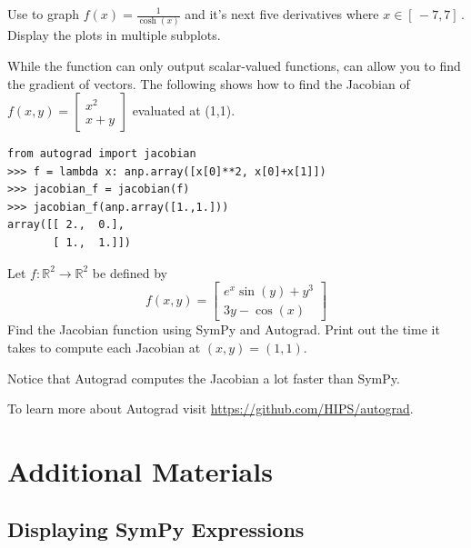 \begin{problem}
Use  to graph $f(x)=\frac{1}{\cosh\left(x\right)}$ and it's next five derivatives where $x\in[\,-7,7 ]\,$. Display the plots in multiple subplots.
\end{problem}

While the  function can only output scalar-valued functions,  can allow you to find the gradient of vectors.
The following shows how to find the Jacobian of $f(x,y) = \left[\begin{array}{c} x^2 \\ x+y \end{array}\right]$ evaluated at (1,1).

\begin{lstlisting}
from autograd import jacobian
>>> f = lambda x: anp.array([x[0]**2, x[0]+x[1]])
>>> jacobian_f = jacobian(f)
>>> jacobian_f(anp.array([1.,1.]))
array([[ 2.,  0.],
       [ 1.,  1.]])
\end{lstlisting}

\begin{problem}
\item Let $f: \mathbb{R}^2 \to \mathbb{R}^2$ be defined by
%
\begin{equation*}
f(x, y) =
\left[\begin{array}{c}
e^{x} \sin(y) + y^3 \\
3y - \cos(x)
\end{array}\right]
\end{equation*}
%
Find the Jacobian function using SymPy and Autograd.  Print out the time it takes to compute each Jacobian at $(x,y) = (1,1)$.

Notice that Autograd computes the Jacobian a lot faster than SymPy.
\end{problem}

To learn more about Autograd visit \url{https://github.com/HIPS/autograd}.

\newpage

\section*{Additional Materials} %

\subsection*{Displaying SymPy Expressions} %

